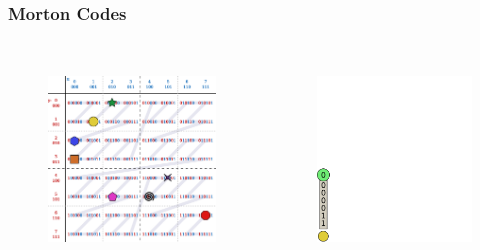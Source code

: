 \documentclass{beamer}
\begin{document}
\begin{frame}
  \frametitle{Morton Codes}
  
\begin{columns}[t]

\begin{figure}
\includegraphics[height=55mm]{Z-curve-primitives.png}
\end{figure}

\begin{figure}
\includegraphics[height=55mm]{keys_0.png}
\end{figure}
\end{columns}
\end{frame}
\end{document}
